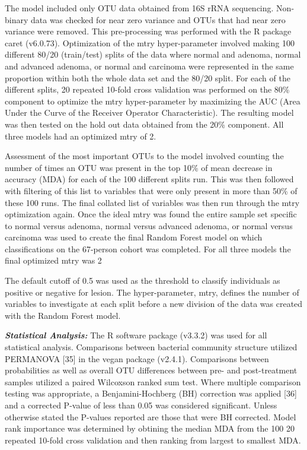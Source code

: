 \documentclass[12pt,]{article}
\begin{document}
The model included only OTU data obtained from 16S rRNA sequencing.
Non-binary data was checked for near zero variance and OTUs that had
near zero variance were removed. This pre-processing was performed with
the R package caret (v6.0.73). Optimization of the mtry hyper-parameter
involved making 100 different 80/20 (train/test) splits of the data
where normal and adenoma, normal and advanced adenoma, or normal and
carcinoma were represented in the same proportion within both the whole
data set and the 80/20 split. For each of the different splits, 20
repeated 10-fold cross validation was performed on the 80\% component to
optimize the mtry hyper-parameter by maximizing the AUC (Area Under the
Curve of the Receiver Operator Characteristic). The resulting model was
then tested on the hold out data obtained from the 20\% component. All
three models had an optimized mtry of 2.

Assessment of the most important OTUs to the model involved counting the
number of times an OTU was present in the top 10\% of mean decrease in
accuracy (MDA) for each of the 100 different splits run. This was then
followed with filtering of this list to variables that were only present
in more than 50\% of these 100 runs. The final collated list of
variables was then run through the mtry optimization again. Once the
ideal mtry was found the entire sample set specific to normal versus
adenoma, normal versus advanced adenoma, or normal versus carcinoma was
used to create the final Random Forest model on which classifications on
the 67-person cohort was completed. For all three models the final
optimized mtry was 2

The default cutoff of 0.5 was used as the threshold to classify
individuals as positive or negative for lesion. The hyper-parameter,
mtry, defines the number of variables to investigate at each split
before a new division of the data was created with the Random Forest
model.

\textbf{\emph{Statistical Analysis:}} The R software package (v3.3.2)
was used for all statistical analysis. Comparisons between bacterial
community structure utilized PERMANOVA {[}35{]} in the vegan package
(v2.4.1). Comparisons between probabilities as well as overall OTU
differences between pre- and post-treatment samples utilized a paired
Wilcoxson ranked sum test. Where multiple comparison testing was
appropriate, a Benjamini-Hochberg (BH) correction was applied {[}36{]}
and a corrected P-value of less than 0.05 was considered significant.
Unless otherwise stated the P-values reported are those that were BH
corrected. Model rank importance was determined by obtining the median
MDA from the 100 20 repeated 10-fold cross validation and then ranking
from largest to smallest MDA.
\end{document}
